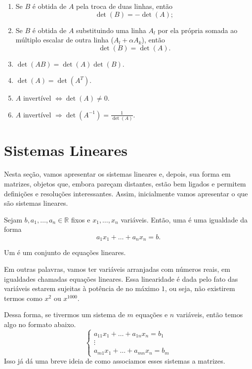 \documentclass[../main.tex]{subfiles}
\begin{document}
\begin{teorema}
\begin{enumerate}[label=\roman*)]
					\[
					\det(B)=\alpha \det(A);
					\]
					\item Se $B$ é obtida de $A$ pela troca de duas linhas, então
					\[
					\det(B)=-\det(A);
					\]
					\item Se $B$ é obtida de $A$ substituindo uma linha $A_l$ por ela própria somada ao múltiplo escalar de outra linha ($A_l+\alpha A_k$), então
					\[
					\det(B)=\det(A).
					\]
					\item $\det(AB)=\det(A)\det(B)$.
					\item $\det(A)=\det(A^T)$.
					\item $A$ invertível $\Leftrightarrow \det(A)\neq 0$.
					\item $A$ invertível $\Rightarrow \det(A^{-1})=\frac{1}{\det(A)}$.
				\end{enumerate}
			\end{teorema}
	\section{Sistemas Lineares}
		Nesta seção, vamos apresentar os sistemas lineares e, depois, sua forma em matrizes, objetos que, embora pareçam distantes, estão bem ligados e permitem definições e resoluções interessantes. Assim, inicialmente vamos apresentar o que são sistemas lineares.
		\begin{definicao}
			Sejam $b, a_1,\dots, a_n\in \mathbb{R}$ fixos e $x_1,\dots,x_n$ variáveis. Então, uma  é uma igualdade da forma
			\[
			a_1x_1+\dots +a_nx_n=b.
			\]
		\end{definicao}
		\begin{definicao}
			Um  é um conjunto de equações lineares.
		\end{definicao}
		Em outras palavras, vamos ter variáveis arranjadas com números reais, em igualdades chamadas equações lineares. Essa linearidade é dada pelo fato das variáveis estarem sujeitas à potência de no máximo $1$, ou seja, não existirem termos como $x^2$ ou $x^{1000}$.
		
		Dessa forma, se tivermos um sistema de $m$ equações e $n$ variáveis, então temos algo no formato abaixo.
		\[
		\begin{cases}
			a_{11}x_1+\dots +a_{1n}x_n=b_1\\
			\vdots\\
			a_{m1}x_1+\dots +a_{mn}x_n=b_m
		\end{cases}
		\]
		Isso já dá uma breve ideia de como associamos esses sistemas a matrizes.
		
\end{document}
